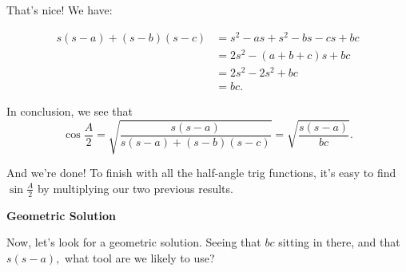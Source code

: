 










That's nice! We have:


\begin{align*}  
    s(s-a) + (s-b)(s-c) &= s^2 - as +s^2-bs-cs+bc\\  
    &=2s^2 -(a+b+c)s + bc\\  
    &=2s^2 -2s^2 + bc\\  
    &= bc.  
    \end{align*}

In conclusion, we see that
$$\cos\frac{A}{2} = \sqrt{\frac{s(s-a)}{s(s-a)+(s-b)(s-c)}}= \sqrt{\frac{s(s-a)}{bc}}.$$

And we're done! To finish with all the half-angle trig functions, it's easy to find $\displaystyle \sin \frac{A}{2}$ by multiplying our two previous results.

\vspace{6pt}
\textbf{Geometric Solution}


Now, let's look for a geometric solution. Seeing that $bc$ sitting in there, and that $s(s-a),$ what tool are we likely to use?



